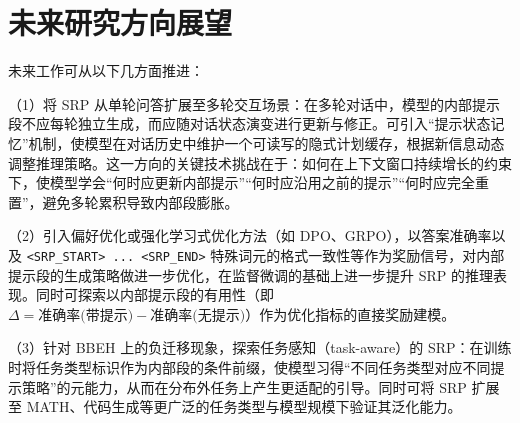 \section{未来研究方向展望}

未来工作可从以下几方面推进：

（1）将 SRP 从单轮问答扩展至多轮交互场景：在多轮对话中，模型的内部提示段不应每轮独立生成，而应随对话状态演变进行更新与修正。可引入“提示状态记忆”机制，使模型在对话历史中维护一个可读写的隐式计划缓存，根据新信息动态调整推理策略。这一方向的关键技术挑战在于：如何在上下文窗口持续增长的约束下，使模型学会“何时应更新内部提示”“何时应沿用之前的提示”“何时应完全重置”，避免多轮累积导致内部段膨胀。

（2）引入偏好优化或强化学习式优化方法（如 DPO、GRPO），以答案准确率以及 \texttt{<SRP\_START> ... <SRP\_END>} 特殊词元的格式一致性等作为奖励信号，对内部提示段的生成策略做进一步优化，在监督微调的基础上进一步提升 SRP 的推理表现。同时可探索以内部提示段的有用性（即 $\Delta = \text{准确率(带提示)} - \text{准确率(无提示)}$）作为优化指标的直接奖励建模。

（3）针对 BBEH 上的负迁移现象，探索任务感知（task-aware）的 SRP：在训练时将任务类型标识作为内部段的条件前缀，使模型习得“不同任务类型对应不同提示策略”的元能力，从而在分布外任务上产生更适配的引导。同时可将 SRP 扩展至 MATH、代码生成等更广泛的任务类型与模型规模下验证其泛化能力。
